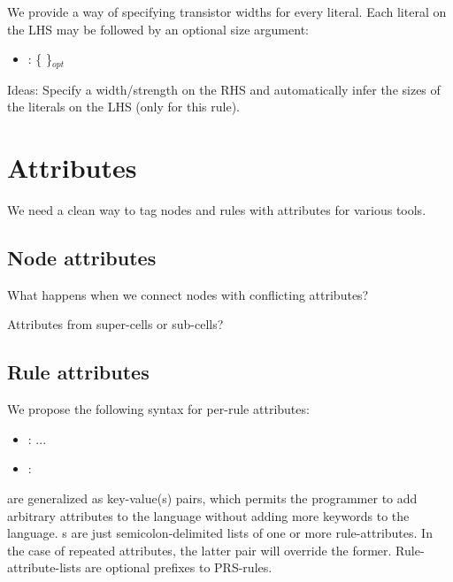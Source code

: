 We provide a way of specifying transistor widths for every literal.  
Each literal on the LHS may be followed by an optional size argument:

\begin{itemize}
\item {} :
	 \{ \ttt{<}  \ttt{>} \}$_{opt}$
\end{itemize}

Ideas: Specify a width/strength on the RHS and automatically infer
the sizes of the literals on the LHS (only for this rule).  

\section{Attributes}
\label{sec:prs:attrib}

We need a clean way to tag nodes and rules with attributes
for various tools.  

\subsection{Node attributes}
\label{sec:prs:attrib:node}

What happens when we connect nodes with conflicting attributes?

Attributes from super-cells or sub-cells?

\subsection{Rule attributes}
\label{sec:prs:attrib:rule}

We propose the following syntax for per-rule attributes:
\begin{itemize}
\item	{} : \ttt{[}  \ttt{;} ... \ttt{]}
\item	{} :  \ttt{=} 
\end{itemize}

 are generalized as key-value(s) pairs, which permits
the programmer to add arbitrary attributes to the language without
adding more keywords to the language.  
s are just semicolon-delimited lists of one or more
rule-attributes.  
In the case of repeated attributes, the latter pair will override the former.  
Rule-attribute-lists are optional prefixes to PRS-rules.  

